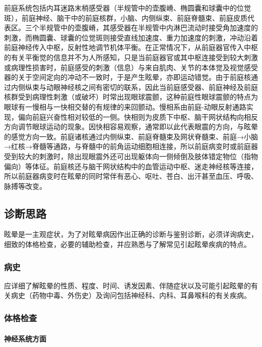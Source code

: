 前庭系统包括内耳迷路末梢感受器（半规管中的壶腹嵴、椭圆囊和球囊中的位觉斑），前庭神经、脑干中的前庭核群，小脑、内侧纵束、前庭脊髓束、前庭皮质代表区。三个半规管中的壶腹嵴，其感受器在半规管中内淋巴流动时接受角加速度的刺激，而椭圆囊、球囊的位觉斑则接受直线加速度、重力加速度的刺激，冲动沿着前庭神经传入中枢，反射性地调节机体平衡。在正常情况下，从前庭器官传入中枢的有关平衡觉的信息并不为人所感知，只是当前庭器官或其中枢连接受到较大刺激或病理性损害时，前庭感受的刺激（信息）与来自肌肉、关节的本体觉及视觉感受器的关于空间定向的冲动不一致时，于是产生眩晕，亦即运动错觉。由于前庭核通过内侧纵束与动眼神经核之间有密切的联系，因此当前庭感受器、前庭神经及前庭核群受到病理性刺激（或破坏）时常出现眼球震颤，这种前庭性眼球震颤的特点为眼球有一慢相与一快相交替的有规律的来回颤动。慢相系由前庭-动眼反射通路实现，偏向前庭兴奋性相对较低的一侧。快相则为皮质下中枢、脑干网状结构向相反方向调节眼球运动的现象。因快相容易观察，通常即以此代表眼震的方向，与眩晕的感觉方向一致。前庭诸核通过内侧纵束、前庭脊髓束及网状脊髓束、前庭→小脑→红核→脊髓等通路，与脊髓中的前角运动细胞相连接，所以前庭病变时或前庭器受到较大的刺激时，除出现眼震外还可出现躯体向一侧倾倒及肢体错定物位（指物偏向）等体征。前庭核还与脑干网状结构中的血管运动中枢、迷走神经核等连接，所以前庭器病变时在眩晕的同时常伴有恶心、呕吐、苍白、出汗甚至血压、呼吸、脉搏等改变。

\subsection{诊断思路}

眩晕是一主观症状，为了对眩晕病因作出正确的诊断与鉴别诊断，必须详询病史，细致的体格检查，必要的辅助检查，并应熟悉与了解常见引起眩晕疾病的特点。

\subsubsection{病史}

应详细了解眩晕的性质、程度、时间、诱发因素、伴随症状以及可能引起眩晕的有关病史（药物中毒、外伤史）及询问包括神经科、内科、耳鼻喉科的有关疾病。

\subsubsection{体格检查}

\paragraph{神经系统方面}

